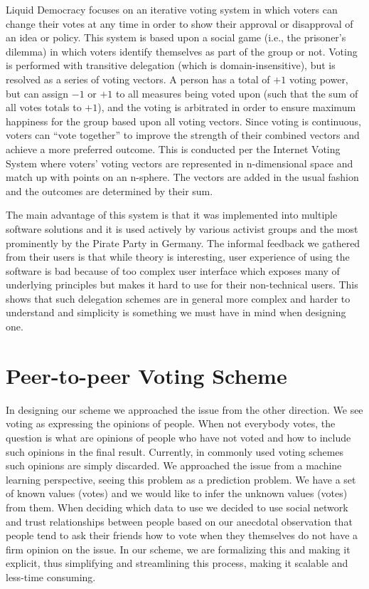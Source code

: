 \documentclass[a4paper]{acm_proc_article-sp}
\begin{document}
Liquid Democracy focuses on an iterative voting system in which voters can change their votes at any time in order to show
their approval or disapproval of an idea or policy.  This system is based upon a social game (i.e., the prisoner's dilemma)
in which voters identify themselves as part of the group or not.  Voting is performed with transitive delegation (which is
domain-insensitive), but is resolved as a series of voting vectors.  A person has a total of $+1$ voting power, but can
assign $-1$ or $+1$ to all measures being voted upon (such that the sum of all votes totals to $+1$), and the voting is
arbitrated in order to ensure maximum happiness for the group based upon all voting vectors.  Since voting is continuous,
voters can ``vote together'' to improve the strength of their combined vectors and achieve a more preferred outcome.  This
is conducted per the Internet Voting System where voters' voting vectors are represented in n-dimensional space and match up
with points on an n-sphere.  The vectors are added in the usual fashion and the outcomes are determined by their sum.

The main advantage of this system is that it was implemented into multiple software solutions and it is used actively by
various activist groups and the most prominently by the Pirate Party in Germany. The informal feedback we gathered from
their users is that while theory is interesting, user experience of using the software is bad because of too complex
user interface which exposes many of underlying principles but makes it hard to use for their non-technical users.
This shows that such delegation schemes are in general more complex and harder to understand and simplicity is something we
must have in mind when designing one.

\section{Peer-to-peer Voting Scheme}

In designing our scheme we approached the issue from the other direction. We see voting as expressing the opinions of
people. When not everybody votes, the question is what are opinions of people who have not voted and how to include
such opinions in the final result. Currently, in commonly used voting schemes such opinions are simply discarded.
We approached the issue from a machine learning perspective, seeing this problem as a prediction problem. We have a set
of known values (votes) and we would like to infer the unknown values (votes) from them. When deciding which data to
use we decided to use social network and trust relationships between people based on our anecdotal observation that
people tend to ask their friends how to vote when they themselves do not have a firm opinion on the issue. In our scheme,
we are formalizing this and making it explicit, thus simplifying and streamlining this process, making it scalable and
less-time consuming.
\end{document}
